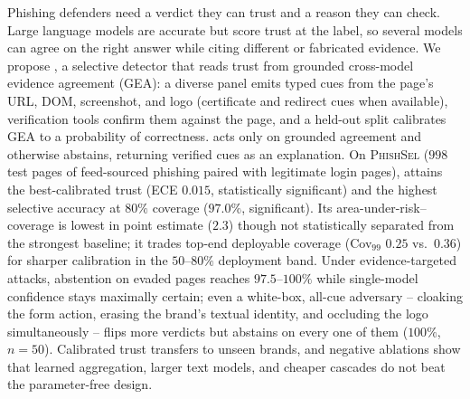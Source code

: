 Phishing defenders need a verdict they can trust and a reason they can check. Large
language models are accurate but score trust at the label, so several models can agree on
the right answer while citing different or fabricated evidence. We propose \toolname{}, a
selective detector that reads trust from grounded cross-model evidence agreement (GEA): a
diverse panel emits typed cues from the page's URL, DOM, screenshot, and logo (certificate
and redirect cues when available), verification tools confirm them against the page, and a
held-out split calibrates GEA to a probability of correctness. \toolname{} acts only on
grounded agreement and otherwise abstains, returning verified cues as an explanation.
On \textsc{PhishSel} ($998$ test pages of feed-sourced phishing paired with legitimate login
pages), \toolname{} attains the best-calibrated trust (ECE $0.015$, statistically
significant) and the highest selective accuracy at $80\%$ coverage ($97.0\%$, significant).
Its area-under-risk--coverage is lowest in point estimate ($2.3$) though not statistically
separated from the strongest baseline; it trades top-end deployable coverage (Cov$_{99}$
$0.25$ vs.\ $0.36$) for sharper calibration in the $50$--$80\%$ deployment band. Under
evidence-targeted attacks, abstention on evaded pages reaches $97.5$--$100\%$ while
single-model confidence stays maximally certain; even a white-box, all-cue
adversary -- cloaking the form action, erasing the brand's textual identity, and
occluding the logo simultaneously -- flips more verdicts but \toolname{} abstains
on every one of them ($100\%$, $n{=}50$). Calibrated trust transfers to
unseen brands, and negative ablations show that learned aggregation, larger text models, and
cheaper cascades do not beat the parameter-free design.
